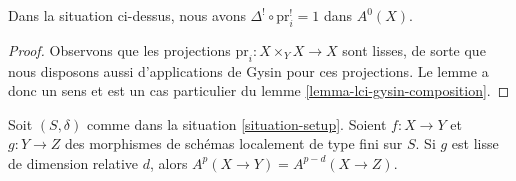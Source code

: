 \begin{lemma}
\label{lemma-diagonal-identity}
Dans la situation ci-dessus, nous avons $\Delta^! \circ \text{pr}_i^! = 1$ dans $A^0(X)$.
\end{lemma}

\begin{proof}
Observons que les projections $\text{pr}_i : X \times_Y X \to X$ sont
lisses, de sorte que nous disposons aussi d'applications de Gysin pour ces projections.
Le lemme a donc un sens et est un cas particulier du
lemme \ref{lemma-lci-gysin-composition}.
\end{proof}

\begin{proposition}
\label{proposition-compute-bivariant}
\begin{reference}
\cite[Proposition 17.4.2]{F}
\end{reference}
Soit $(S, \delta)$ comme dans la situation \ref{situation-setup}.
Soient $f : X \to Y$ et $g : Y \to Z$ des morphismes de schémas localement
de type fini sur $S$. Si $g$ est lisse de dimension relative $d$, alors
$A^p(X \to Y) = A^{p - d}(X \to Z)$.
\end{proposition}


